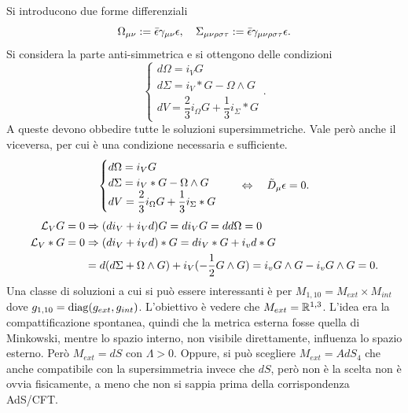 Si introducono due forme differenziali
\begin{equation}
    \Omega_{\mu\nu} := \bar{\epsilon}\gamma_{\mu\nu}\epsilon,\quad \Sigma_{\mu\nu\rho\sigma\tau} := \bar{\epsilon}\gamma_{\mu\nu\rho\sigma\tau}\epsilon.
\end{equation}
Si considera la parte anti-simmetrica e si ottengono delle condizioni
\begin{equation}
    \begin{cases}
        d\Omega = i_VG \\
        d\Sigma = i_V*G - \Omega \wedge G \\
        dV = \dfrac{2}{3}i_\Omega G + \dfrac{1}{3}i_\Sigma *G
    \end{cases}.
\end{equation}
A queste devono obbedire tutte le soluzioni supersimmetriche. Vale però anche il viceversa, per cui è una condizione necessaria e sufficiente. 
\begin{equation}
    \begin{cases}
        d\Omega = i_VG \\
        d\Sigma = i_V*G - \Omega \wedge G \\
        dV = \dfrac{2}{3}i_\Omega G + \dfrac{1}{3}i_\Sigma *G
    \end{cases}\quad \Leftrightarrow \quad \tilde{D}_\mu\epsilon = 0.
\end{equation}
\begin{equation}
    \begin{split}
        \mathcal{L}_VG = 0 &\Rightarrow (di_V + i_Vd)G = di_VG = dd\Omega = 0 \\
        \mathcal{L}_V*G = 0 &\Rightarrow (di_V + i_Vd)*G = di_V*G +i_vd*G \\
        &= d(d\Sigma + \Omega \wedge G) + i_V(-\frac{1}{2}G \wedge G) = i_vG\wedge G - i_vG\wedge G = 0.
    \end{split}
\end{equation}
Una classe di soluzioni a cui si può essere interessanti è per $M_{1,10} = M_{ext} \times M_{int}$ dove $g_{1,10} = \mathrm{diag}{(g_{ext}, g_{int})}$. L'obiettivo è vedere che $M_{ext} = \mathbb{R}^{1,3}$. L'idea era la compattificazione spontanea, quindi che la metrica esterna fosse quella di Minkowski, mentre lo spazio interno, non visibile direttamente, influenza lo spazio esterno. Però $M_{ext} = dS$ con $\Lambda > 0$. Oppure, si può scegliere $M_{ext} = AdS_4$ che anche compatibile con la supersimmetria invece che $dS$, però non è la scelta non è ovvia fisicamente, a meno che non si sappia prima della corrispondenza AdS/CFT. 

